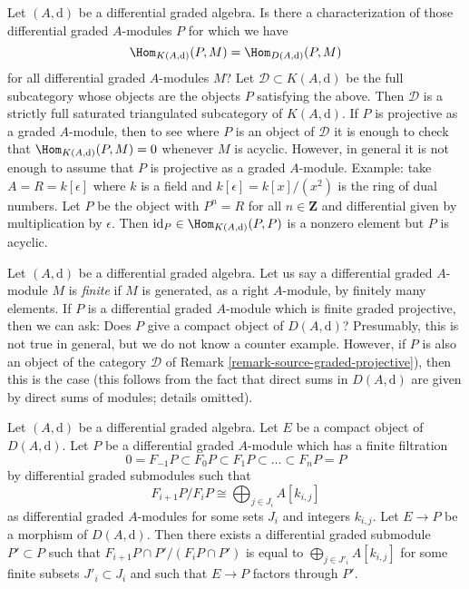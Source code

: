\begin{remark}
\label{remark-source-graded-projective}
Let $(A, \text{d})$ be a differential graded algebra. Is there a
characterization of those differential graded $A$-modules $P$
for which we have
$$
\Hom_{K(A, \text{d})}(P, M) =  \Hom_{D(A, \text{d})}(P, M)
$$
for all differential graded $A$-modules $M$? Let
$\mathcal{D} \subset K(A, \text{d})$ be the full subcategory
whose objects are the objects $P$ satisfying the above. Then $\mathcal{D}$
is a strictly full saturated triangulated subcategory of $K(A, \text{d})$.
If $P$ is projective as a graded $A$-module, then to see where $P$
is an object of $\mathcal{D}$ it is enough to check that
$\Hom_{K(A, \text{d})}(P, M) = 0$ whenever $M$ is acyclic.
However, in general it is not enough to assume that $P$ is projective as
a graded $A$-module. Example: take $A = R = k[\epsilon]$ where $k$ is
a field and $k[\epsilon] = k[x]/(x^2)$ is the ring of dual numbers.
Let $P$ be the object with $P^n = R$ for all $n \in \mathbf{Z}$
and differential given by multiplication by $\epsilon$. Then
$\text{id}_P \in \Hom_{K(A, \text{d})}(P, P)$ is a nonzero element
but $P$ is acyclic.
\end{remark}

\begin{remark}
\label{remark-graded-projective-is-compact}
Let $(A, \text{d})$ be a differential graded algebra. Let us say a
differential graded $A$-module $M$ is {\it finite} if $M$ is generated,
as a right $A$-module, by finitely many elements. If $P$ is a
differential graded $A$-module which is finite graded projective,
then we can ask: Does $P$ give a compact object of $D(A, \text{d})$?
Presumably, this is not true in general, but we do not know a
counter example. However, if $P$ is also an object of the category
$\mathcal{D}$ of Remark \ref{remark-source-graded-projective}),
then this is the case (this follows from the fact that direct sums
in $D(A, \text{d})$ are given by direct sums of modules; details omitted).
\end{remark}

\begin{lemma}
\label{lemma-factor-through-nicer}
Let $(A, \text{d})$ be a differential graded algebra. Let $E$ be a compact
object of $D(A, \text{d})$. Let $P$ be a differential graded $A$-module
which has a finite filtration
$$
0 = F_{-1}P \subset F_0P \subset F_1P \subset \ldots \subset F_nP = P
$$
by differential graded submodules such that
$$
F_{i + 1}P/F_iP \cong \bigoplus\nolimits_{j \in J_i} A[k_{i, j}]
$$
as differential graded $A$-modules for some sets $J_i$ and integers $k_{i, j}$.
Let $E \to P$ be a morphism of $D(A, \text{d})$.
Then there exists a differential graded submodule $P' \subset P$ such that
$F_{i + 1}P \cap P'/(F_iP \cap P')$ is equal to
$\bigoplus_{j \in J'_i} A[k_{i, j}]$ for some finite subsets
$J'_i \subset J_i$ and such that $E \to P$ factors through $P'$.
\end{lemma}

